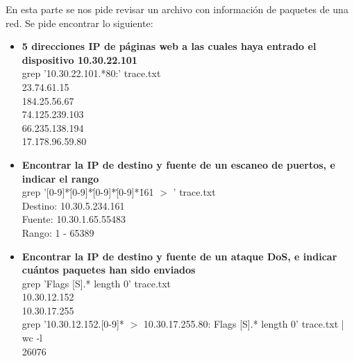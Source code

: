 \documentclass[a4paper,12pt]{article}
\begin{document}
En esta parte se nos pide revisar un archivo con información de paquetes de una red. Se pide encontrar lo siguiente:
\begin{itemize}
 \item \textbf{5 direcciones IP de páginas web a las cuales haya entrado el dispositivo 10.30.22.101} \\
 grep '10.30.22.101.*80:' trace.txt \\
 23.74.61.15 \\
   184.25.56.67 \\
   74.125.239.103 \\
   66.235.138.194 \\
   17.178.96.59.80 \\
  \item \textbf{Encontrar la IP de destino y fuente de un escaneo de puertos, e indicar el rango} \\
  grep '[0-9]*\.[0-9]*\.[0-9]*\.[0-9]*\.161 $>$ ' trace.txt \\
  Destino: 10.30.5.234.161 \\
  Fuente: 10.30.1.65.55483 \\
  Rango: 1 - 65389 \\
  \item \textbf{Encontrar la IP de destino y fuente de un ataque DoS, e indicar cuántos paquetes han sido enviados} \\
  grep 'Flags [S].* length 0' trace.txt \\
  10.30.12.152 \\
  10.30.17.255 \\
  grep '10.30.12.152.[0-9]* $>$ 10.30.17.255.80: Flags [S].* length 0' trace.txt | wc -l \\
  26076 \\
\end{itemize}
\end{document}
